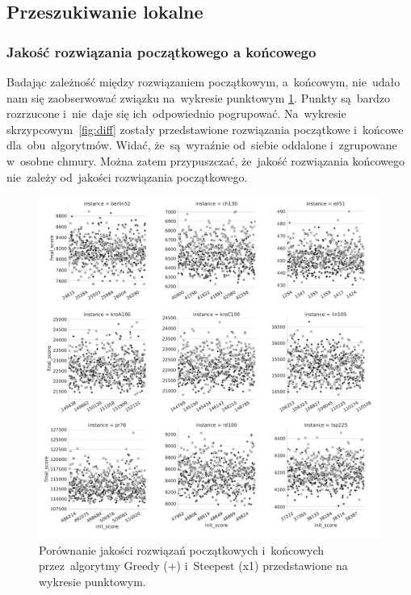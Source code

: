 \subsection{Przeszukiwanie lokalne}

\subsubsection{Jakość rozwiązania początkowego a końcowego}

Badając zależność między rozwiązaniem początkowym, a~końcowym, nie~udało nam się zaobserwować związku na~wykresie punktowym \ref{fig:diff_point}. Punkty są~bardzo rozrzucone i~nie~daje się ich~odpowiednio pogrupować. Na~wykresie skrzypcowym~\ref{fig:diff} zostały przedstawione rozwiązania początkowe i~końcowe dla~obu~algorytmów. Widać, że~są~wyraźnie od~siebie oddalone i~zgrupowane w~osobne chmury. Można zatem przypuszczać, że~jakość rozwiązania końcowego nie~zależy od~jakości rozwiązania początkowego.

\begin{figure}[H]
\begin{center}
\includegraphics[width=1.0\textwidth]{graphs/init_vs_final_score_point.pdf}
\end{center}
\caption{Porównanie jakości rozwiązań początkowych i~końcowych przez~algorytmy Greedy (+) i~Steepest (x1) przedstawione na wykresie punktowym.}
\label{fig:diff_point}
\end{figure}

